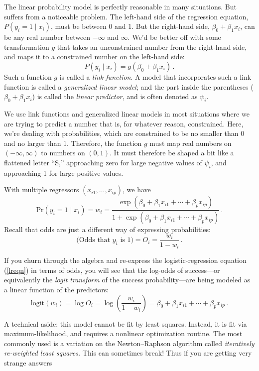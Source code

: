 \documentclass[11pt]{article}
\newcommand{\1}[1]{\mathbf{1}_{\{ {#1} \}}}
\begin{document}
The linear probability model is perfectly reasonable in many situations.  But suffers from a noticeable problem.  The left-hand side of the regression equation, $P(y_i = 1 \mid x_i)$, must be between 0 and 1.  But the right-hand side, $\beta_0 + \beta_1 x_i$, can be any real number between $-\infty$ and $\infty$.  We'd be better off with some transformation $g$ that takes an unconstrained number from the right-hand side, and maps it to a constrained number on the left-hand side:
$$
P(y_i \mid x_i) = g(\beta_0 + \beta_1 x_i) \, .
$$
Such a function $g$ is called a \textit{link function}.  A model that incorporates such a link function is called a \textit{generalized linear model}; and the part inside the parentheses ($\beta_0 + \beta_1 x_i$) is called the \textit{linear predictor}, and is often denoted as $\psi_i$.

We use link functions and generalized linear models in most situations where we are trying to predict a number that is, for whatever reason, constrained.  Here, we're dealing with probabilities, which are constrained to be no smaller than 0 and no larger than 1. Therefore, the function $g$ must map real numbers on $(-\infty, \infty)$ to numbers on $(0,1)$.  It must therefore be shaped a bit like a flattened letter ``S,'' approaching zero for large negative values of $\psi_i$, and approaching 1 for large positive values.

With multiple regressors $(x_{i1}, \ldots, x_{ip})$, we have
\begin{equation}
\label{lreqn}
\mbox{Pr}(y_i = 1  \mid x_i) = w_i = \frac{\exp(\beta_0 + \beta_1 x_{i1} + \cdots + \beta_p x_{ip})}
	{1+ \exp(\beta_0 + \beta_1 x_{i1} + \cdots + \beta_p x_{ip})} \, .
\end{equation}
Recall that odds are just a different way of expressing probabilities:
$$
\mbox{(Odds that $y_i$ is 1)} = O_i = \frac{w_i}{1-w_i} \, .
$$

If you churn through the algebra and re-express the logistic-regression equation (\ref{lreqn}) in terms of odds, you will see that the log-odds of success---or equivalently the \textit{logit transform} of the success probability---are being modeled as a linear function of the predictors:
$$
 \mbox{logit}(w_i)  = \log O_i = \log \left( \frac{w_i}{1-w_i } \right) = \beta_0 + \beta_1 x_{i1} + \cdots + \beta_p x_{ip} \, .
$$

A technical aside: this model cannot be fit by least squares.  Instead, it is fit via maximum-likelihood, and requires a nonlinear optimization routine.  The most commonly used is a variation on the Newton--Raphson algorithm called \textit{iteratively re-weighted least squares.}  This can sometimes break!  Thus if you are getting very strange answers
\end{document}
